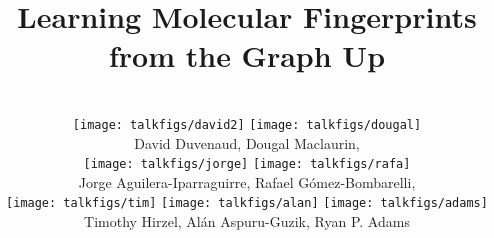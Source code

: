 
\usepackage{etex}
\usepackage{tabularx}
\usepackage{include/picins}
\usepackage{include/preamble}
\usepackage{setspace}
\usepackage{xcolor}
\usepackage{tikz}
\usepackage{listings}
\usepackage{algorithm}
\usepackage[noend]{algpseudocode}
\usepackage{caption}
\usepackage{booktabs}
\usepackage{natbib}
\usepackage{array}

\hypersetup{
    colorlinks=true,
    linkcolor=mydarkblue,
    citecolor=mydarkblue,
    filecolor=mydarkblue,
    urlcolor=mydarkblue}
    
%
\lstset{language=Python} 

\setlength{\columnsep}{0.03\textwidth}
\setlength{\columnseprule}{0.0018\textwidth}
\setlength{\parindent}{0.0cm}
\newcommand{\paren}[1]{\left( #1 \right)}


\title{Learning Molecular Fingerprints\\from the Graph Up}

\author{
\vspace{-0.5cm}\\
\texttt{[image: talkfigs/david2]}
\qquad\qquad
\texttt{[image: talkfigs/dougal]} \\
David Duvenaud, Dougal Maclaurin, \\
\texttt{[image: talkfigs/jorge]}
\qquad\qquad
\texttt{[image: talkfigs/rafa]}
\qquad\qquad \\
Jorge Aguilera-Iparraguirre, Rafael G\'omez-Bombarelli, \\
\texttt{[image: talkfigs/tim]}
\qquad\qquad
\texttt{[image: talkfigs/alan]}
\qquad\qquad
\texttt{[image: talkfigs/adams]}
\\
Timothy Hirzel, Al\'an Aspuru-Guzik, Ryan P. Adams}

